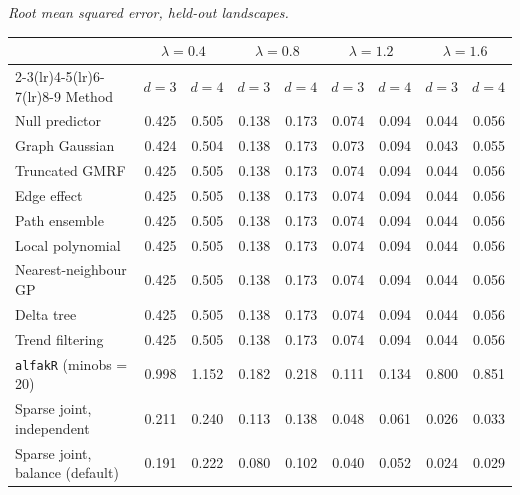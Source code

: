 \par\medskip\noindent\begin{minipage}{\linewidth}
\textit{Root mean squared error, held-out landscapes.}
\begin{center}
\footnotesize
\setlength{\tabcolsep}{3.5pt}
\begin{tabular}{l*{8}{r}}
\toprule
 & \multicolumn{2}{c}{$\lambda=0.4$} & \multicolumn{2}{c}{$\lambda=0.8$} & \multicolumn{2}{c}{$\lambda=1.2$} & \multicolumn{2}{c}{$\lambda=1.6$} \\
\cmidrule(lr){2-3}\cmidrule(lr){4-5}\cmidrule(lr){6-7}\cmidrule(lr){8-9}
Method & $d=3$ & $d=4$ & $d=3$ & $d=4$ & $d=3$ & $d=4$ & $d=3$ & $d=4$ \\
\midrule
Null predictor & 0.425 & 0.505 & 0.138 & 0.173 & 0.074 & 0.094 & 0.044 & 0.056 \\
Graph Gaussian & 0.424 & 0.504 & 0.138 & 0.173 & 0.073 & 0.094 & 0.043 & 0.055 \\
Truncated GMRF & 0.425 & 0.505 & 0.138 & 0.173 & 0.074 & 0.094 & 0.044 & 0.056 \\
Edge effect & 0.425 & 0.505 & 0.138 & 0.173 & 0.074 & 0.094 & 0.044 & 0.056 \\
Path ensemble & 0.425 & 0.505 & 0.138 & 0.173 & 0.074 & 0.094 & 0.044 & 0.056 \\
Local polynomial & 0.425 & 0.505 & 0.138 & 0.173 & 0.074 & 0.094 & 0.044 & 0.056 \\
Nearest-neighbour GP & 0.425 & 0.505 & 0.138 & 0.173 & 0.074 & 0.094 & 0.044 & 0.056 \\
Delta tree & 0.425 & 0.505 & 0.138 & 0.173 & 0.074 & 0.094 & 0.044 & 0.056 \\
Trend filtering & 0.425 & 0.505 & 0.138 & 0.173 & 0.074 & 0.094 & 0.044 & 0.056 \\
\texttt{alfakR} (minobs = 20) & 0.998 & 1.152 & 0.182 & 0.218 & 0.111 & 0.134 & 0.800 & 0.851 \\
Sparse joint, independent & 0.211 & 0.240 & 0.113 & 0.138 & 0.048 & 0.061 & 0.026 & 0.033 \\
Sparse joint, balance (default) & 0.191 & 0.222 & 0.080 & 0.102 & 0.040 & 0.052 & 0.024 & 0.029 \\
\bottomrule
\end{tabular}
\end{center}
\end{minipage}

